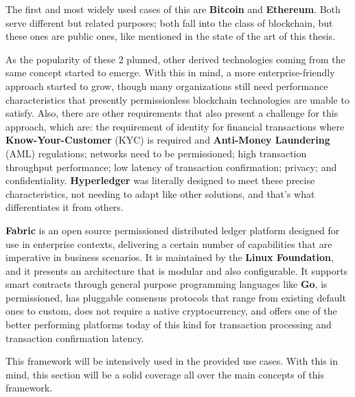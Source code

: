 The first and most widely used cases of this are \textbf{Bitcoin} and \textbf{Ethereum}. Both serve different but related purposes; both fall into the class of blockchain, but these ones are public ones, like mentioned in the state of the art of this thesis.

As the popularity of these 2 plumed, other derived technologies coming from the same concept started to emerge. With this in mind, a more enterprise-friendly approach started to grow, though many organizations still need performance characteristics that presently permissionless blockchain technologies are unable to satisfy. Also, there are other requirements that also present a challenge for this approach, which are: the requirement of identity for financial transactions where \textbf{Know-Your-Customer} (KYC) is required and \textbf{Anti-Money Laundering} (AML) regulations; networks need to be permissioned; high transaction throughput performance; low latency of transaction confirmation; privacy; and confidentiality. \textbf{Hyperledger} was literally designed to meet these precise characteristics, not needing to adapt like other solutions, and that's what differentiates it from others.

\textbf{Fabric} is an open source permissioned distributed ledger platform designed for use in enterprise contexts, delivering a certain number of capabilities that are imperative in business scenarios. It is maintained by the \textbf{Linux Foundation}, and it presents an architecture that is modular and also configurable. It supports smart contracts through general purpose programming languages like \textbf{Go}, is permissioned, has pluggable consensus protocols that range from existing default ones to custom, does not require a native cryptocurrency, and offers one of the better performing platforms today of this kind for transaction processing and transaction confirmation latency.

This framework will be intensively used in the provided use cases. With this in mind, this section will be a solid coverage all over the main concepts of this framework.

